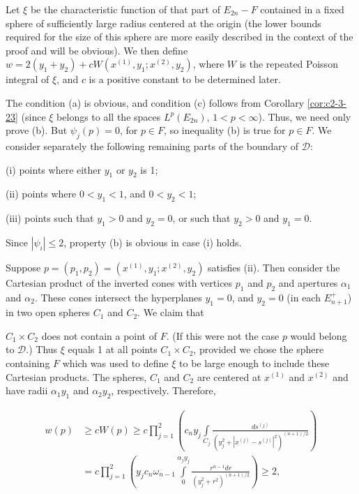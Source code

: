 Let $\xi$ be the characteristic function of that part of $E_{2n} - F$ contained in a fixed sphere of sufficiently large radius centered at the origin (the lower bounds required for the size of this sphere are more easily described in the context of the proof and will be obvious). We then define $w = 2(y_1 + y_2) + cW(x^{(1)}, y_1; x^{(2)}, y_2)$, where $W$ is the repeated Poisson integral of $\xi$, and $c$ is a positive constant to be determined later.

The condition (a) is obvious, and condition (c) follows from Corollary \ref{cor:c2-3-23} (since $\xi$ belongs to all the spaces $L^p(E_{2n})$, $1 < p < \infty$). Thus, we need only prove (b). But $\psi_j(p) = 0$, for $p \in F$, so inequality (b) is true for $p \in F$. We consider separately the following remaining parts of the boundary of $\mathcal{D}$:

(i) points where either $y_{1}$ or $y_{2}$ is 1;

(ii) points where $0 < y_{1} < 1$, and $0 < y_{2} < 1$;

(iii) points such that $y_{1} > 0$ and $y_{2} = 0$, or such that $y_{2} > 0$ and $y_{1} = 0$.

Since $|\psi_i| \leq 2$, property (b) is obvious in case (i) holds.

Suppose $p = (p_1, p_2) = (x^{(1)}, y_1; x^{(2)}, y_2)$ satisfies (ii). Then consider the Cartesian product of the inverted cones with vertices $p_1$ and $p_2$ and apertures $\alpha_1$ and $\alpha_2$. These cones intersect the hyperplanes $y_1 = 0$, and $y_2 = 0$ (in each $E_{n+1}^+$) in two open spheres $C_1$ and $C_2$. We claim that

$C_1 \times C_2$ does not contain a point of $F$. (If this were not the case $p$ would belong to $\mathcal{D}$.) Thus $\xi$ equals 1 at all points $C_1 \times C_2$, provided we chose the sphere containing $F$ which was used to define $\xi$ to be large enough to include these Cartesian products. The spheres, $C_1$ and $C_2$ are centered at $x^{(1)}$ and $x^{(2)}$ and have radii $\alpha_1 y_1$ and $\alpha_2 y_2$, respectively. Therefore,

\[
\begin{aligned}w(p)&\geq cW(p)\geq c\prod_{j=1}^{2}\left(c_{n} y_{j}\int\limits_{C_{j}}\frac{ds^{(j)}}{(y_{j}^{2}+|x^{(j)}-s^{(j)}|^{2})^{(n+1)/2}}\right)\\&=c\prod_{j=1}^{2}\left(y_{j} c_{n}\omega_{n-1}\int\limits_{0}^{\alpha_{j} y_{j}}\frac{r^{n-1}dr}{(y_{j}^{2}+r^{2})^{(n+1)/2}}\right)\geq2,\end{aligned}
\]

